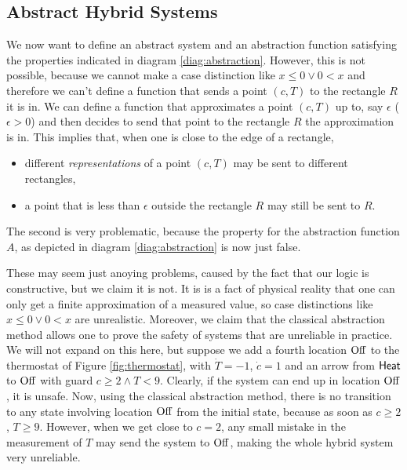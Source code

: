 \documentclass[runningheads]{llncs}
\renewcommand{\leq}{\leqslant}
\renewcommand{\geq}{\geqslant}
\newcommand{\Heat}{{\sf Heat}}
\newcommand{\Off}{{\rm Off}}
\begin{document}
\subsection{Abstract Hybrid Systems}
\label{abshybsys}
\label{abstraction}
We now want to define an abstract system and an abstraction function
satisfying the properties indicated in diagram
\ref{diag:abstraction}. However, this is not possible, because we
cannot make a case distinction like $x\leq 0 \vee 0< x$ and therefore
we can't define a function that sends a point $(c,T)$ to the rectangle $R$
it is in. We can define a function that approximates a point $(c,T)$
up to, say $\epsilon$ ($\epsilon >0$) and then decides to send that
point to the rectangle $R$ the approximation is in. This implies that,
when one is close to the edge of a rectangle,
\begin{itemize}
\item 
different {\em representations\/} of a point $(c,T)$ may be
sent to different rectangles,
\item
a point that is less than $\epsilon$ outside the rectangle $R$ may still be sent to $R$.
\end{itemize}
The second is very problematic, because the property for the
abstraction function $A$, as depicted in diagram
\ref{diag:abstraction} is now just false.

These may seem just anoying problems,
caused by the fact that our logic is constructive, but we claim it is
not. It is is a fact of physical reality that one can only get a
finite approximation of a measured value, so case distinctions like
$x\leq 0 \vee 0< x$ are unrealistic. Moreover, we claim that the
classical abstraction method allows one to prove the safety of systems
that are unreliable in practice. We will not expand on this here, but
suppose we add a fourth location $\Off$ to the thermostat of Figure
\ref{fig:thermostat}, with $\dot{T} = -1$, $\dot{c} =1$ and an arrow
from $\Heat$ to $\Off$ with guard $c\geq 2 \wedge T<9$. Clearly, if
the system can end up in location $\Off$, it is unsafe. Now, using
the classical abstraction method, there is no transition to any state
involving location $\Off$ from the initial state, because as soon as
$c\geq 2$, $T\geq 9$. However, when we get close to $c=2$, any small
mistake in the measurement of $T$ may send the system to $\Off$,
making the whole hybrid system very unreliable.
\end{document}
